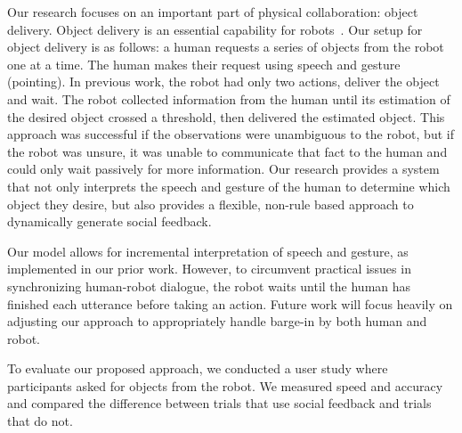 \documentclass[letterpaper]{article}
\newcommand{\stnote}[1]{\textcolor{blue}{\textbf{ST: #1}}}
\begin{document}



Our research focuses on an important part of physical
collaboration: object delivery. Object delivery is an
essential capability for robots~\cite{Huang15}. 
Our setup for object delivery is as follows: a human requests
a series of objects from the robot one at a time.  The human makes their
request using speech and gesture (pointing).  In previous work, the
robot had only two actions, deliver the object and wait. The robot collected
information from the human until its estimation of the desired object
crossed a threshold, then delivered the estimated object.  This
approach was successful if the observations were unambiguous to the
robot, but if the robot was unsure, it was unable to communicate that
fact to the human and could only wait passively for more information.
Our research provides a system that not only interprets the speech 
and gesture of the human to determine which object they desire, but 
also provides a flexible, non-rule based approach to dynamically generate
social feedback. 

Our model allows for incremental interpretation of speech and gesture, as implemented in our prior work. However, to circumvent practical issues in synchronizing human-robot dialogue, the robot waits until the human has finished each utterance before taking an action. Future work will focus heavily on adjusting our approach to appropriately handle barge-in by both human and robot. 
 
 
To evaluate our proposed approach, we conducted a user study where
participants asked for objects from the robot. We measured
speed and accuracy and compared the difference between trials that use
social feedback and trials that do not.
\end{document}

